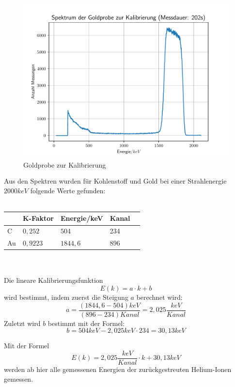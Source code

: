 \begin{figure}[htbp]  
     \includegraphics{Goldprobe_zur_Kalibrierung.pdf}
  \caption{Goldprobe zur Kalibrierung}
  \label{Goldprobe}
\end{figure}

Aus den Spektren wurden für Kohlenstoff und Gold bei einer Strahlenergie $2000keV$ folgende Werte gefunden:\\\\
\begin{tabular}{|l|l|l|l|l|}
\hline
 & K-Faktor & Energie/keV & Kanal\\
 \hline
 C & $0,252$ & $504$ & 234\\
 \hline
 Au & $0,9223$ & $1844,6$ & 896\\
 \hline
\end{tabular}\\\\
Die lineare Kalibrierungsfunktion
\begin{equation}
 E(k)= a\cdot k + b
\end{equation}
wird bestimmt, indem zuerst die Steigung $a$ berechnet wird:
\begin{equation}
 a = \frac{(1844,6 - 504)keV}{(896 - 234)Kanal}=2,025\frac{keV}{Kanal}
\end{equation}
Zuletzt wird $b$ bestimmt mit der Formel:
\begin{equation}
 b = 504keV - 2,025 keV\cdot 234 = 30,13 keV
\end{equation}

Mit der Formel
\begin{equation}
 E(k)=2,025\frac{keV}{Kanal}\cdot k + 30,13keV 
\end{equation}
werden ab hier alle gemessenen Energien der zurückgestreuten Helium-Ionen gemessen.
